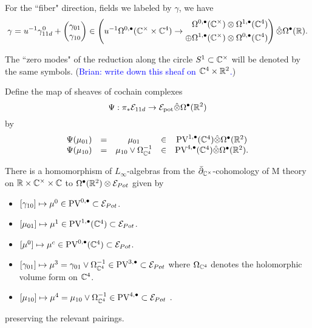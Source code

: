 \documentclass[11pt]{article}
\newcommand{\brian}[1]{(\textcolor{blue}{Brian: #1})}
\newcommand\bu{\bullet}
\begin{document}
For the ``fiber" direction, fields we labeled by $\gamma$, we have
\[
\gamma = u^{-1} \gamma_{11d}^0 + \begin{pmatrix} \gamma_{01} \\ \gamma_{10} \end{pmatrix} \in \left (u^{-1} \Omega^{0,\bullet}(\mathbb{C}^\times\times\mathbb{C}^4) \to \begin{aligned} & \Omega^{0,\bullet}(\mathbb{C}^\times)\otimes\Omega^{1,\bullet}(\mathbb{C}^4)\\ \oplus & \Omega^{1,\bullet}(\mathbb{C}^\times)\otimes\Omega^{0,\bullet}(\mathbb{C}^4)\end{aligned} \right ) \Hat{\otimes} \Omega^\bullet(\mathbb{R}).
\]

The ``zero modes" of the reduction along the circle $S^1 \subset \mathbb{C}^\times$ will be denoted by the same symbols.
\brian{write down this sheaf on $\mathbb{C}^4 \times \mathbb{R}^2$.}

Define the map of sheaves of cochain complexes 
\[
\Psi : \pi_* \mc E_{11d} \to \mc E_{\rm pot} \Hat{\otimes} \Omega^\bu(\mb R^2) 
\] 
by
\[
\begin{array}{cccccccc}
\Psi (\mu_{01}) & = & \mu_{01} & \in & \PV^{1,\bu}(\mb C^4) \Hat{\otimes} \Omega^\bu(\mb R^2) \\
\Psi (\mu_{10}) & = & \mu_{10} \vee \Omega^{-1}_{\mb C^4} & \in & \PV^{4,\bu}(\mb C^4) \Hat{\otimes} \Omega^\bu(\mb R^2) .
\end{array}
\]



\begin{prop}
There is a homomorphism of $L_\infty$-algebras from the $\bar{\partial}_{\mathbb{C}^\times}$-cohomology of M theory on $\mathbb{R}\times\mathbb{C}^\times\times\mathbb{C}$ to $\Omega^\bullet(\mathbb{R}^2)\otimes\mathcal{E}_{Pot}$ given by
\begin{itemize}
\item $[\gamma_{10}]\mapsto\mu^0\in\text{PV}^{0,\bullet}\subset\mathcal{E}_{Pot}$.
  \item $[\mu_{01}]\mapsto\mu^1\in\text{PV}^{1,\bullet}(\mathbb{C}^4)\subset\mathcal{E}_{Pot}$.
\item $[\mu^{0}]\mapsto\mu^{c}\in\text{PV}^{0, \bullet}(\mathbb{C}^{4})\subset\mathcal{E}_{Pot}$.
\item $[\gamma_{01}]\mapsto\mu^3 = \gamma_{01}\vee\Omega^{-1}_{\mathbb{C}^4}\in\text{PV}^{3,\bullet}\subset\mathcal{E}_{Pot}$ where $\Omega_{\mathbb{C}^4}$ denotes the holomorphic volume form on $\mathbb{C}^4$.
\item $[\mu_{10}]\mapsto\mu^4 =\mu_{10}\vee\Omega^{-1}_{\mathbb{C}^4}\in\text{PV}^{4,\bullet}\subset\mathcal{E}_{Pot}$ .


\end{itemize}
preserving the relevant pairings.
\end{prop}
\end{document}
